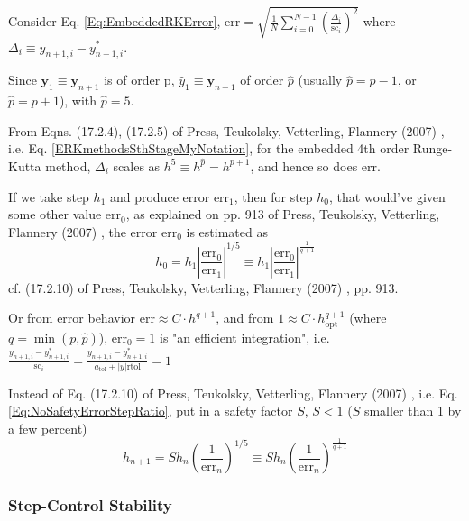 \documentclass[10pt]{amsart}
\begin{document}
\begin{multicols*}{2}
Consider Eq. \ref{Eq:EmbeddedRKError}, $\text{err} = \sqrt{ \frac{1}{N} \sum_{i=0}^{N-1} \left( \frac{ \Delta_i}{ \text{sc}_i } \right)^2 }$ where $\Delta_i \equiv y_{n+1,i} - y^*_{n+1, i}$. 

Since $\mathbf{y}_1 \equiv \mathbf{y}_{n+1}$ is of order p, $\widehat{y}_1 \equiv \mathbf{y}_{n+1}$ of order $\widehat{p}$ (usually $\widehat{p} = p -1$, or $\widehat{p} = p+1$), with $\widehat{p} = 5$. 

From Eqns. (17.2.4), (17.2.5) of Press, Teukolsky, Vetterling, Flannery (2007) \cite{PTVF2007}, i.e. Eq. \ref{ERKmethodsSthStageMyNotation}, for the embedded 4th order Runge-Kutta method, $\Delta_i$ scales as $h^5 \equiv h^{\widehat{p}} = h^{p+1}$, and hence so does $\text{err}$.  

If we take step $h_1$ and produce error $\text{err}_1$, then for step $h_0$, that would've given some other value $\text{err}_0$, as explained on pp. 913 of Press, Teukolsky, Vetterling, Flannery (2007) \cite{PTVF2007}, the error $\text{err}_0$ is estimated as
\begin{equation}\label{Eq:NoSafetyErrorStepRatio}
	h_0 = h_1 \left|\frac{ \text{err}_0 }{ \text{err}_1} \right|^{1/5} \equiv h_1 \left| \frac{ \text{err}_0}{ \text{err}_1 } \right|^{\frac{1}{q+1} }
\end{equation}
cf. (17.2.10) of Press, Teukolsky, Vetterling, Flannery (2007) \cite{PTVF2007}, pp. 913.

Or from error behavior $\text{err} \approx C \cdot h^{q+1}$, and from $1 \approx C \cdot h^{q+1}_{\text{opt}}$ (where $q= \min{(p, \widehat{p})}$), $\text{err}_0 =1$ is "an efficient integration", i.e. $\frac{ y_{n+1, i} - y^*_{n+1,i} }{ \text{sc}_i } = \frac{ y_{n+1, i} - y^*_{n+1, i} }{ a_{\text{tol}} + |y| \text{rtol} } = 1$

Instead of Eq. (17.2.10) of Press, Teukolsky, Vetterling, Flannery (2007) \cite{PTVF2007}, i.e. Eq. \ref{Eq:NoSafetyErrorStepRatio}, put in a safety factor $S$, $S<1$ ($S$ smaller than 1 by a few percent)
\begin{equation}\label{Eq:ScaleStepSizeWithSafety}
h_{n+1} = S h_n \left( \frac{1}{ \text{err}_n } \right)^{1/5} \equiv S h_n \left( \frac{1}{ \text{err}_n } \right)^{ \frac{1}{q+1} }
\end{equation}

\subsubsection{Step-Control Stability}


\end{multicols*}
\end{document}
